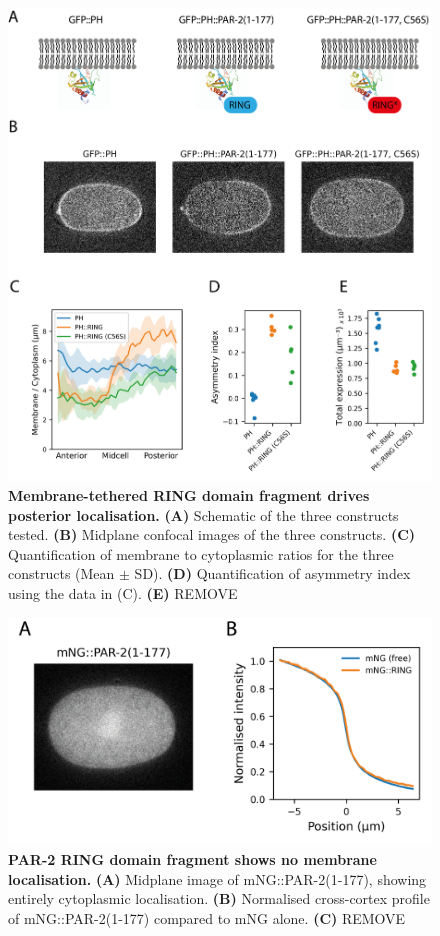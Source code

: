 \documentclass[12pt]{"article"}
\newcommand{\mycaption}[2]{\caption[#1]{\textbf{#1.} #2}}
\begin{document}
\begin{figure}[!h]
\includegraphics[scale=1]{ph_ring}
\setlength{\abovecaptionskip}{20pt}
\centering
\mycaption{Membrane-tethered RING domain fragment drives posterior localisation}{
\textbf{(A)} Schematic of the three constructs tested.
\textbf{(B)} Midplane confocal images of the three constructs.
\textbf{(C)} Quantification of membrane to cytoplasmic ratios for the three constructs (Mean $\pm$ SD).
\textbf{(D)} Quantification of asymmetry index using the data in (C).
\textbf{(E)} REMOVE
}
\label{fig:ph_ring}
\end{figure}

\begin{figure}
\includegraphics[scale=1]{ring_fragment_in_vivo}
\centering
\mycaption{PAR-2 RING domain fragment shows no membrane localisation}{
\textbf{(A)} Midplane image of mNG::PAR-2(1-177), showing entirely cytoplasmic localisation.
\textbf{(B)} Normalised cross-cortex profile of mNG::PAR-2(1-177) compared to mNG alone.
\textbf{(C)} REMOVE
}
\label{fig:ring_fragment_in_vivo}
\end{figure}
\end{document}
